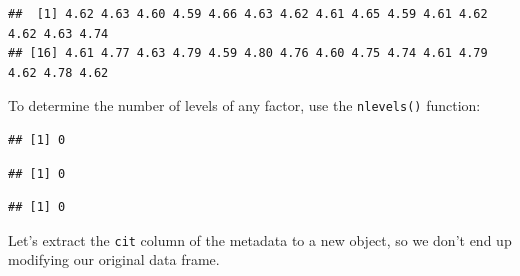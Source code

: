 \documentclass[
]{book}
\newenvironment{Shaded}{\begin{snugshade}}{\end{snugshade}}
\newcommand{\FunctionTok}[1]{\textcolor[rgb]{0.13,0.29,0.53}{\textbf{#1}}}
\newcommand{\NormalTok}[1]{#1}
\newcommand{\OtherTok}[1]{\textcolor[rgb]{0.56,0.35,0.01}{#1}}
\newcommand{\SpecialCharTok}[1]{\textcolor[rgb]{0.81,0.36,0.00}{\textbf{#1}}}
\begin{document}
\begin{Shaded}
\end{Shaded}

\begin{verbatim}
##  [1] 4.62 4.63 4.60 4.59 4.66 4.63 4.62 4.61 4.65 4.59 4.61 4.62 4.62 4.63 4.74
## [16] 4.61 4.77 4.63 4.79 4.59 4.80 4.76 4.60 4.75 4.74 4.61 4.79 4.62 4.78 4.62
\end{verbatim}

To determine the number of levels of any factor, use the \texttt{nlevels()} function:

\begin{Shaded}
\end{Shaded}

\begin{verbatim}
## [1] 0
\end{verbatim}

\begin{Shaded}
\end{Shaded}

\begin{verbatim}
## [1] 0
\end{verbatim}

\begin{Shaded}
\end{Shaded}

\begin{verbatim}
## [1] 0
\end{verbatim}

Let's extract the \texttt{cit} column of the metadata to a new object, so we don't end up modifying our original data frame.

\begin{Shaded}
\end{Shaded}
\end{document}
